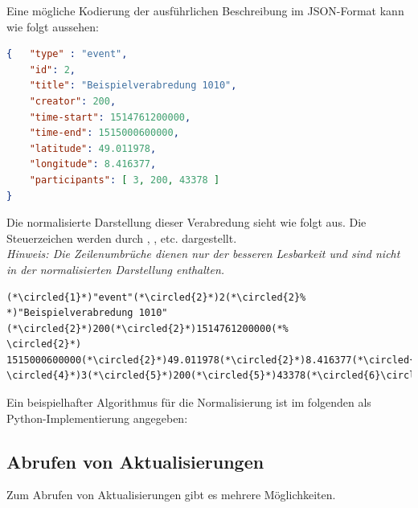 \documentclass[parskip=full,11pt]{scrartcl}
\begin{document}
Eine mögliche Kodierung der ausführlichen Beschreibung im JSON-Format kann wie
folgt aussehen:
\begin{lstlisting}[language=json,firstnumber=1]
{   "type" : "event",
    "id": 2,
    "title": "Beispielverabredung 1010",
    "creator": 200,
    "time-start": 1514761200000,
    "time-end": 1515000600000,
    "latitude": 49.011978,
    "longitude": 8.416377,
    "participants": [ 3, 200, 43378 ]
}
\end{lstlisting}

\newcommand*\circled[1]{\tikz[baseline=(char.base)]{
            \node[shape=circle,draw,inner sep=1pt] (char) {\scriptsize #1};}}

Die normalisierte Darstellung dieser Verabredung sieht wie folgt aus.
Die Steuerzeichen werden durch \circled{1}, \circled{2}, \circled{3} etc.
dargestellt.\\
\textit{Hinweis: Die Zeilenumbrüche dienen nur der besseren Lesbarkeit und sind
nicht in der normalisierten Darstellung enthalten.}

\begin{lstlisting}[language=norm,firstnumber=1]
(*\circled{1}*)"event"(*\circled{2}*)2(*\circled{2}%
*)"Beispielverabredung 1010"(*\circled{2}*)200(*\circled{2}*)1514761200000(*%
\circled{2}*)
1515000600000(*\circled{2}*)49.011978(*\circled{2}*)8.416377(*\circled{2}%
\circled{4}*)3(*\circled{5}*)200(*\circled{5}*)43378(*\circled{6}\circled{3}*)
\end{lstlisting}

\par Ein beispielhafter Algorithmus für die Normalisierung ist im folgenden
als Python-Implementierung angegeben:


\subsection{Abrufen von Aktualisierungen}\label{sec:get-updates}
Zum Abrufen von Aktualisierungen gibt es mehrere Möglichkeiten.
\end{document}
